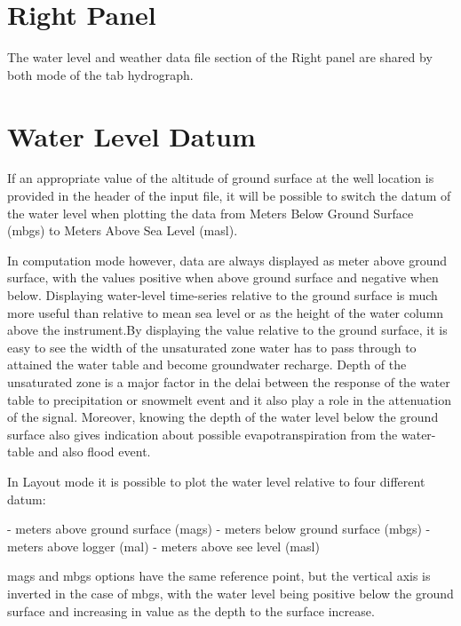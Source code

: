 \documentclass[WHATMANUAL.tex]{subfiles}
\begin{document}
\section{Right Panel}

The water level and weather data file section of the Right panel are shared by both mode of the tab hydrograph. 

\section{Water Level Datum}

If an appropriate value of the altitude of ground surface at the well location is provided in the header of the input file, it will be possible to switch the datum of the water level when plotting the data from Meters Below Ground Surface (mbgs) to Meters Above Sea Level (masl).

In computation mode however, data are always displayed as meter above ground surface, with the values positive when above ground surface and negative when below. Displaying water-level time-series relative to the ground surface is much more useful than relative to mean sea level or as the height of the water column above the instrument.By displaying the value relative to the ground surface, it is easy to see the width of the unsaturated zone water has to pass through to attained the water table and become groundwater recharge. Depth of the unsaturated zone is a major factor in the delai between the response of the water table to precipitation or snowmelt event and it also play a role in the attenuation of the signal. Moreover, knowing the depth of the water level below the ground surface also gives indication about possible evapotranspiration from the water-table and also flood event.

In Layout mode it is possible to plot the water level relative to four different datum:

- meters above ground surface (mags)
- meters below ground surface (mbgs)
- meters above logger (mal)
- meters above see level (masl)

mags and mbgs options have the same reference point, but the vertical axis is inverted in the case of mbgs, with the water level being positive below the ground surface and increasing in value as the depth to the surface increase.
\end{document}
